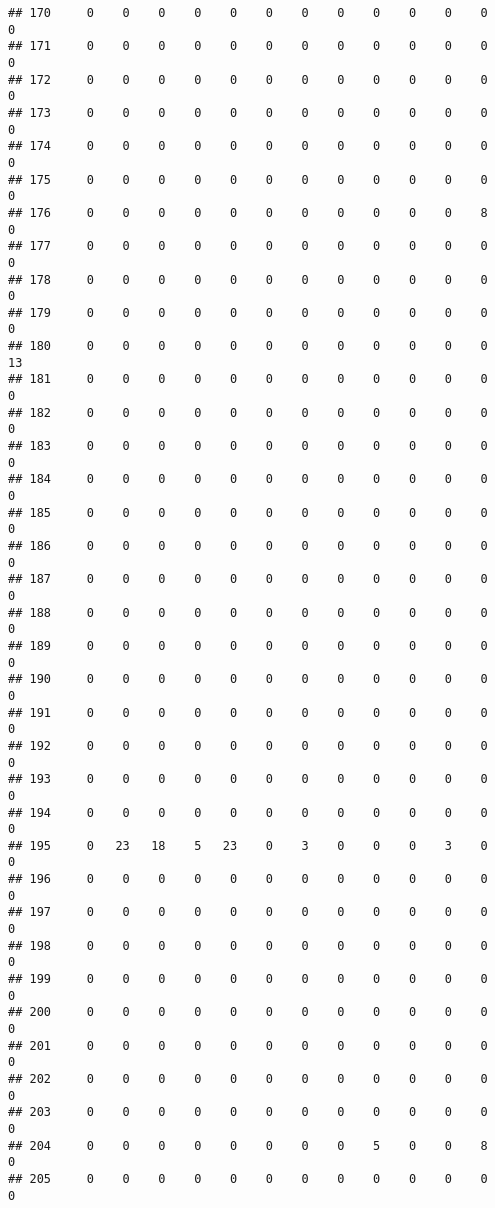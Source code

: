 \documentclass[]{article}
\begin{document}
\begin{verbatim}
## 170     0    0    0    0    0    0    0    0    0    0    0    0    0
## 171     0    0    0    0    0    0    0    0    0    0    0    0    0
## 172     0    0    0    0    0    0    0    0    0    0    0    0    0
## 173     0    0    0    0    0    0    0    0    0    0    0    0    0
## 174     0    0    0    0    0    0    0    0    0    0    0    0    0
## 175     0    0    0    0    0    0    0    0    0    0    0    0    0
## 176     0    0    0    0    0    0    0    0    0    0    0    8    0
## 177     0    0    0    0    0    0    0    0    0    0    0    0    0
## 178     0    0    0    0    0    0    0    0    0    0    0    0    0
## 179     0    0    0    0    0    0    0    0    0    0    0    0    0
## 180     0    0    0    0    0    0    0    0    0    0    0    0   13
## 181     0    0    0    0    0    0    0    0    0    0    0    0    0
## 182     0    0    0    0    0    0    0    0    0    0    0    0    0
## 183     0    0    0    0    0    0    0    0    0    0    0    0    0
## 184     0    0    0    0    0    0    0    0    0    0    0    0    0
## 185     0    0    0    0    0    0    0    0    0    0    0    0    0
## 186     0    0    0    0    0    0    0    0    0    0    0    0    0
## 187     0    0    0    0    0    0    0    0    0    0    0    0    0
## 188     0    0    0    0    0    0    0    0    0    0    0    0    0
## 189     0    0    0    0    0    0    0    0    0    0    0    0    0
## 190     0    0    0    0    0    0    0    0    0    0    0    0    0
## 191     0    0    0    0    0    0    0    0    0    0    0    0    0
## 192     0    0    0    0    0    0    0    0    0    0    0    0    0
## 193     0    0    0    0    0    0    0    0    0    0    0    0    0
## 194     0    0    0    0    0    0    0    0    0    0    0    0    0
## 195     0   23   18    5   23    0    3    0    0    0    3    0    0
## 196     0    0    0    0    0    0    0    0    0    0    0    0    0
## 197     0    0    0    0    0    0    0    0    0    0    0    0    0
## 198     0    0    0    0    0    0    0    0    0    0    0    0    0
## 199     0    0    0    0    0    0    0    0    0    0    0    0    0
## 200     0    0    0    0    0    0    0    0    0    0    0    0    0
## 201     0    0    0    0    0    0    0    0    0    0    0    0    0
## 202     0    0    0    0    0    0    0    0    0    0    0    0    0
## 203     0    0    0    0    0    0    0    0    0    0    0    0    0
## 204     0    0    0    0    0    0    0    0    5    0    0    8    0
## 205     0    0    0    0    0    0    0    0    0    0    0    0    0

\end{verbatim}
\end{document}
